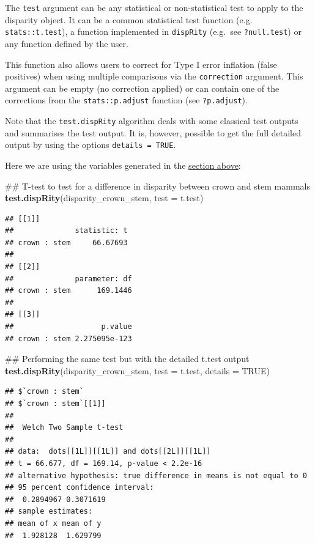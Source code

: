 \documentclass[]{book}
\newenvironment{Shaded}{\begin{snugshade}}{\end{snugshade}}
\newcommand{\KeywordTok}[1]{\textcolor[rgb]{0.13,0.29,0.53}{\textbf{#1}}}
\newcommand{\DataTypeTok}[1]{\textcolor[rgb]{0.13,0.29,0.53}{#1}}
\newcommand{\OtherTok}[1]{\textcolor[rgb]{0.56,0.35,0.01}{#1}}
\newcommand{\NormalTok}[1]{#1}
\theoremstyle{definition}
\theoremstyle{definition}
\theoremstyle{definition}
\theoremstyle{remark}
\begin{document}
The \texttt{test} argument can be any statistical or non-statistical
test to apply to the disparity object. It can be a common statistical
test function (e.g. \texttt{stats::t.test}), a function implemented in
\texttt{dispRity} (e.g.~see \texttt{?null.test}) or any function defined
by the user.

This function also allows users to correct for Type I error inflation
(false positives) when using multiple comparisons via the
\texttt{correction} argument. This argument can be empty (no correction
applied) or can contain one of the corrections from the
\texttt{stats::p.adjust} function (see \texttt{?p.adjust}).

Note that the \texttt{test.dispRity} algorithm deals with some classical
test outputs and summarises the test output. It is, however, possible to
get the full detailed output by using the options
\texttt{details\ =\ TRUE}.

Here we are using the variables generated in the
\protect\hyperlink{summarising-dispRity-data-plots}{section above}:

\begin{Shaded}
\begin{Highlighting}[]
\NormalTok{## T-test to test for a difference in disparity between crown and stem mammals}
\KeywordTok{test.dispRity}\NormalTok{(disparity_crown_stem, }\DataTypeTok{test =}\NormalTok{ t.test)}
\end{Highlighting}
\end{Shaded}

\begin{verbatim}
## [[1]]
##              statistic: t
## crown : stem     66.67693
## 
## [[2]]
##              parameter: df
## crown : stem      169.1446
## 
## [[3]]
##                    p.value
## crown : stem 2.275095e-123
\end{verbatim}

\begin{Shaded}
\begin{Highlighting}[]
\NormalTok{## Performing the same test but with the detailed t.test output}
\KeywordTok{test.dispRity}\NormalTok{(disparity_crown_stem, }\DataTypeTok{test =}\NormalTok{ t.test, }\DataTypeTok{details =} \OtherTok{TRUE}\NormalTok{)}
\end{Highlighting}
\end{Shaded}

\begin{verbatim}
## $`crown : stem`
## $`crown : stem`[[1]]
## 
##  Welch Two Sample t-test
## 
## data:  dots[[1L]][[1L]] and dots[[2L]][[1L]]
## t = 66.677, df = 169.14, p-value < 2.2e-16
## alternative hypothesis: true difference in means is not equal to 0
## 95 percent confidence interval:
##  0.2894967 0.3071619
## sample estimates:
## mean of x mean of y 
##  1.928128  1.629799
\end{verbatim}
\end{document}
